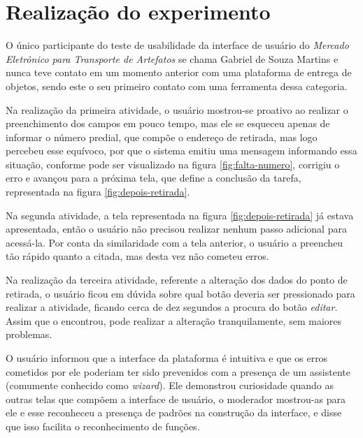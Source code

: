 \documentclass[
	article,
	11pt,
	oneside,
	a4paper,
	english,
	brazil,
	sumario=tradicional
]{abntex2}
\begin{document}
\vspace*{\fill}
\pagebreak
	
\section*{Realização do experimento}
	
	O único participante do teste de usabilidade da interface de usuário do \textit{Mercado Eletrônico para Transporte de Artefatos} se chama Gabriel de Souza Martins e nunca teve contato em um momento anterior com uma plataforma de entrega de objetos, sendo este o seu primeiro contato com uma ferramenta dessa categoria.
	
	Na realização da primeira atividade, o usuário mostrou-se proativo ao realizar o preenchimento dos campos em pouco tempo, mas ele se esqueceu apenas de informar o número predial, que compõe o endereço de retirada, mas logo percebeu esse equívoco, por que o sistema emitiu uma mensagem informando essa situação, conforme pode ser visualizado na figura \ref{fig:falta-numero}, corrigiu o erro e avançou para a próxima tela, que define a conclusão da tarefa, representada na figura \ref{fig:depois-retirada}.
	
	Na segunda atividade, a tela representada na figura \ref{fig:depois-retirada} já estava apresentada, então o usuário não precisou realizar nenhum passo adicional para acessá-la. Por conta da similaridade com a tela anterior, o usuário a preencheu tão rápido quanto a citada, mas desta vez não cometeu erros.
	
	Na realização da terceira atividade, referente a alteração dos dados do ponto de retirada, o usuário ficou em dúvida sobre qual botão deveria ser pressionado para realizar a atividade, ficando cerca de dez segundos a procura do botão \textit{editar}. Assim que o encontrou, pode realizar a alteração tranquilamente, sem maiores problemas.
	
	O usuário informou que a interface da plataforma é intuitiva e que os erros cometidos por ele poderiam ter sido prevenidos com a presença de um assistente (comumente conhecido como \textit{wizard}). Ele demonstrou curiosidade quando as outras telas que compõem a interface de usuário, o moderador mostrou-as para ele e esse reconheceu a presença de padrões na construção da interface, e disse que isso facilita o reconhecimento de funções.
	
\vspace*{\fill}
\pagebreak
	
\end{document}
